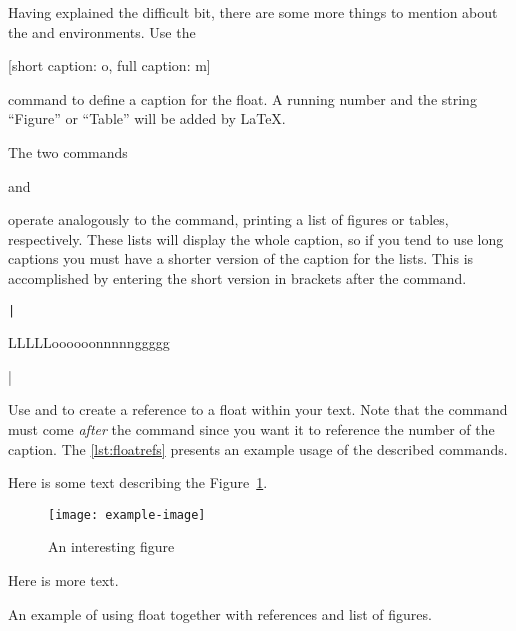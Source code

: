 Having explained the difficult bit, there are some more things to mention about
the  and  environments. Use the
\begin{lscommand}
  [short caption: o, full caption: m]
\end{lscommand}
command to define a caption for the float. A running number and
the string \enquote{Figure} or \enquote{Table} will be added by \LaTeX.

The two commands
\begin{lscommand}
   and 
\end{lscommand}
operate analogously to the  command, printing a list of
figures or tables, respectively.  These lists will display the whole caption,
so if you tend to use long captions you must have a shorter version of the
caption for the lists. This is accomplished by entering the short version in
brackets after the  command.
\begin{code}
\texttt|\caption[Short]{LLLLLoooooonnnnnggggg}|
\end{code}

Use  and  to create a reference to a float within
your text. Note that the  command must come \emph{after} the
 command since you want it to reference the number of the
caption. The \autoref{lst:floatrefs} presents an example usage of the described
commands.
\begin{listing}
  \begin{lined}{11cm}
    \begin{example}[standalone, paperheight=4.5cm, to_page=2, vertical_pages]
\usepackage{graphicx} %
\geometry{includefoot} %
\listoffigures
\vspace{.3cm}%

Here is some text describing
the Figure~\ref{figure}.

\begin{figure}
  \centering
  \texttt{[image: example-image]}
  \caption[A figure]{An
    interesting figure}%
  \label{figure}
\end{figure}

Here is more text.
\end{example}
  \end{lined}
  \caption{An example of using  float together with references and
    list of figures.}\label{lst:floatrefs}
\end{listing}

